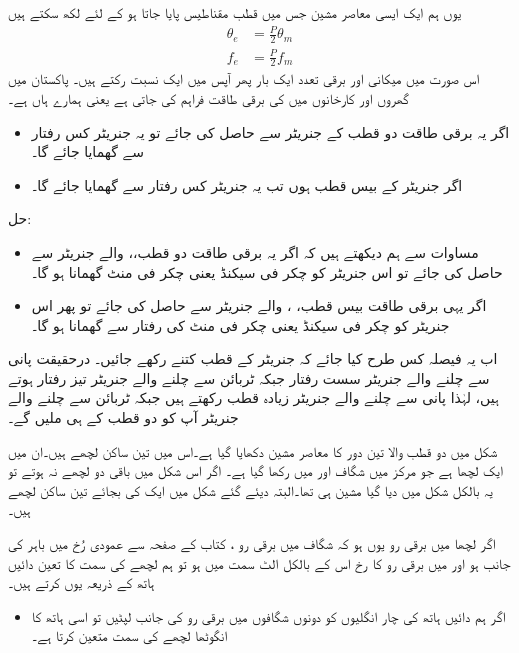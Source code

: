  یوں ہم ایک ایسی معاصر مشین جس میں  قطب مقناطیس پایا جاتا ہو کے لئے لکھ سکتے ہیں
\begin{align}
\theta_e&=\frac{P}{2} \theta_m\\
f_e&=\frac{P}{2} f_m
\end{align}
اس صورت میں میکانی اور برقی تعدد ایک بار پھر آپس میں ایک نسبت رکتے ہیں۔ 
%
پاکستان میں گھروں اور کارخانوں میں  کی برقی طاقت فراہم کی جاتی ہے یعنی ہمارے ہاں  ہے۔
\begin{itemize}
\item
اگر یہ برقی طاقت دو قطب کے جنریٹر سے حاصل کی جائے تو یہ جنریٹر  کس رفتار سے گھمایا جائے گا۔
\item
اگر جنریٹر کے بیس قطب ہوں تب یہ جنریٹر کس رفتار سے گھمایا جائے گا۔
\end{itemize}

حل:
\begin{itemize}
\item
مساوات  سے ہم دیکھتے ہیں کہ اگر یہ برقی طاقت دو قطب،،  والے جنریٹر سے حاصل کی جائے تو اس جنریٹر کو  چکر فی سیکنڈ یعنی  چکر فی منٹ گھمانا ہو گا۔
\item
 اگر یہی برقی طاقت بیس قطب، ،  والے جنریٹر سے حاصل کی جائے تو پھر اس جنریٹر کو  چکر فی سیکنڈ یعنی  چکر فی منٹ کی رفتار سے گھمانا ہو گا۔
\end{itemize}
%

 اب یہ فیصلہ کس طرح کیا جائے کہ جنریٹر کے قطب کتنے رکھے جائیں۔ درحقیقت پانی سے چلنے والے جنریٹر سست رفتار جبکہ ٹربائن سے چلنے والے جنریٹر تیز رفتار ہوتے ہیں، لہٰذا پانی سے چلنے والے جنریٹر زیادہ قطب رکھتے ہیں جبکہ ٹربائن سے چلنے والے جنریٹر آپ کو دو قطب کے ہی ملیں گے۔

شکل  میں دو قطب والا تین دور کا معاصر مشین دکھایا گیا ہے۔اس میں تین ساکن لچھے ہیں۔ان میں ایک لچھا  ہے جو مرکز میں  شگاف   اور  میں رکھا گیا ہے۔ اگر اس شکل میں باقی دو لچھے نہ ہوتے تو یہ بالکل شکل  میں دیا گیا مشین ہی تھا۔البتہ دیئے گئے شکل میں ایک کی بجائے تین ساکن لچھے ہیں۔

 اگر  لچھا  میں برقی رو یوں ہو کہ شگاف  میں برقی رو ، کتاب کے صفحہ سے عمودی رُخ میں باہر کی جانب ہو اور   میں برقی رو کا رخ اس کے بالکل الٹ سمت میں ہو تو ہم لچھے کی سمت کا تعین دائیں ہاتھ کے ذریعہ یوں کرتے ہیں۔

\begin{itemize}
\item
اگر ہم دائیں ہاتھ کی چار انگلیوں کو دونوں شگافوں میں برقی رو کی جانب لپٹیں تو اسی ہاتھ کا انگوٹھا لچھے کی سمت متعین کرتا ہے۔
\end{itemize}


